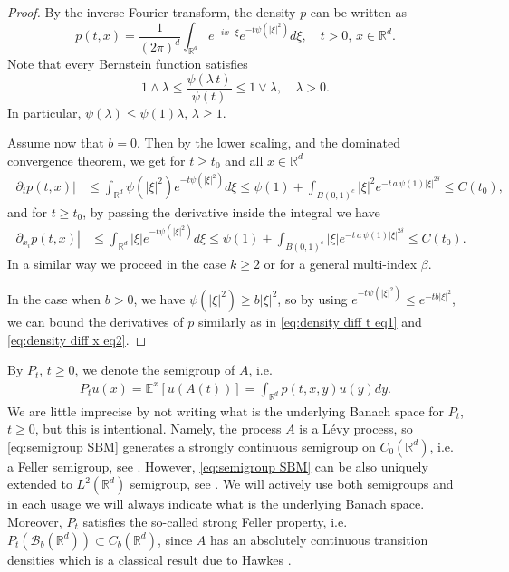 \documentclass[reqno]{amsart}
\theoremstyle{remark}
\numberwithin{equation}{section} %
\newcommand{\R}{\mathbb{R}}
\newcommand{\BB}{\mathcal{B}}
\newcommand{\1}{\mathds{1}}
\begin{document}
	\begin{proof}
		
		By the inverse Fourier transform, the density $p$ can be written as
		$$ p(t,x)=\frac{1}{(2\pi)^{d}}\int_{\mathbb{R}^d} e^{-i x\cdot \xi} e^{-t \psi (|\xi|^2)}d\xi,\quad t>0,\, x\in \mathbb{R}^d.$$
		Note that every Bernstein function satisfies
		$$1\wedge \lambda \le \frac{\psi(\lambda \, t)}{\psi(t)}\le 1\vee \lambda,\quad \lambda >0.$$
		In particular, $\psi(\lambda)\le\psi(1) \lambda$, $\lambda\ge 1$.
		
		Assume now that $b=0$. Then by the lower scaling, and the dominated convergence theorem, we get for $t\ge t_0$ and all $x\in \mathbb{R}^d$
		\begin{align}
			|\partial_tp(t,x)|&\le \int_{\mathbb{R}^d}\psi(|\xi|^2)e^{-t \psi (|\xi|^2)}d\xi\le \psi(1)+\int_{B(0,1)^c}|\xi|^2e^{-t\, a\,\psi(1) |\xi|^{2\delta}} \le C(t_0),\label{eq:density diff t eq1}
		\end{align}
		and for $t\ge t_0$, by passing the derivative inside the integral we have
		\begin{align}
			|\partial_{x_i}p(t,x)|&\le \int_{\mathbb{R}^d}|\xi|e^{-t \psi (|\xi|^2)}d\xi\le \psi(1)+\int_{B(0,1)^c}|\xi|e^{-t\, a\,\psi(1) |\xi|^{2\delta}} \le C(t_0).\label{eq:density diff x eq2}
		\end{align}
		In a similar way we proceed in the case $k\ge 2$ or for a general multi-index $\beta$.
		
		In the case when $b> 0$, we have $\psi(|\xi|^2)\ge b |\xi|^2$, so by using $e^{-t\psi(|\xi|^2)}\le e^{-tb |\xi|^2}$, we can bound the derivatives of $p$ similarly as in  \eqref{eq:density diff t eq1} and \eqref{eq:density diff x eq2}.
	\end{proof}
	By $P_t$, $t \geq 0$, we denote the semigroup of $A$, i.e.
	\begin{align}\label{eq:semigroup SBM}
		P_tu(x)=\mathds{E}^x[u(A(t))]=\int_{\mathbb{R}^d}p(t,x,y)u(y)dy.
	\end{align}
	We are little imprecise by not writing what is the underlying Banach space for $P_t$, $t\ge0$, but this is intentional. Namely, the process $A$ is a L\'evy process, so \eqref{eq:semigroup SBM} generates a strongly continuous semigroup on $C_0(\R^d)$, i.e. a Feller semigroup, see \cite[Section 2.1]{schillinglevy}. However, \eqref{eq:semigroup SBM} can be also uniquely extended to $L^2(\R^d)$ semigroup, see \cite[Section 1.5]{schillinglevy}.  We will actively use both semigroups and in each usage we will always indicate what is the underlying Banach space. Moreover, $P_t$ satisfies the so-called strong Feller property, i.e. $P_t (\BB_b(\R^d))\subset C_b(\R^d)$, since $A$ has an absolutely continuous transition densities which is a classical result due to Hawkes \cite{Hawkes-potential-levy79}.
	
\end{document}
